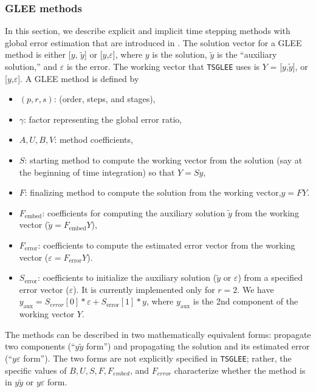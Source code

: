 \subsubsection{GLEE methods} In this section, we describe explicit and
implicit time stepping methods with global error estimation that are
introduced in \cite{Constantinescu_TR2016b}.
The solution vector for a GLEE method is either [$y$, $\tilde{y}$] or
[$y$,$\varepsilon$], where $y$ is the solution, $\tilde{y}$ is the
``auxiliary solution,'' and $\varepsilon$ is the error. The working
vector that \lstinline{TSGLEE} uses is $Y$ = [$y$,$\tilde{y}$], or
[$y$,$\varepsilon$]. A GLEE method is defined by 
\begin{itemize}
\item $(p,r,s)$: (order, steps, and stages),
\item $\gamma$: factor representing the global error ratio,
\item $A, U, B, V$: method coefficients,
\item $S$: starting method to compute the working vector from the
solution (say at the beginning of time integration) so that $Y = Sy$,
\item $F$: finalizing method to compute the solution from the working
vector,$y = FY$.
\item $F_\text{embed}$: coefficients for computing the auxiliary solution
$\tilde{y}$ from the working vector ($\tilde{y} = F_\text{embed} Y$),
\item $F_\text{error}$: coefficients to compute the estimated error vector
from the working vector ($\varepsilon = F_\text{error} Y$).
\item $S_\text{error}$: coefficients to initialize the auxiliary solution
($\tilde{y}$ or $\varepsilon$) from a specified error vector
($\varepsilon$). It is currently implemented only for $r = 2$. We have $y_\text{aux} =
S_{error}[0]*\varepsilon + S_\text{error}[1]*y$, where $y_\text{aux}$ is the 2nd
component of the working vector $Y$. 
\end{itemize}
The methods can be described in two mathematically equivalent forms:
propagate two components (``$y\tilde{y}$ form'') and propagating the
solution and its estimated error (``$y\varepsilon$ form''). The
two forms are not explicitly specified in \lstinline{TSGLEE}; rather, the specific values
of $B, U, S, F, F_{embed}$, and $F_{error}$ characterize whether the method is
in $y\tilde{y}$ or $y\varepsilon$ form.

